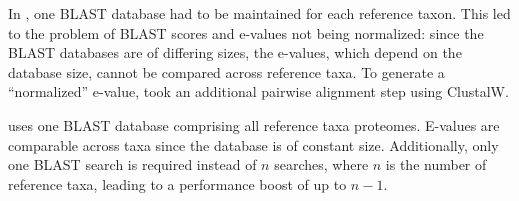 In \hamstr, one BLAST database had to be maintained for each reference taxon.
This led to the problem of BLAST scores and e-values not being normalized: since
the \hamstr BLAST databases are of differing sizes, the e-values, which depend
on the database size, cannot be compared across reference taxa. To generate a
``normalized'' e-value, \hamstr took an additional pairwise alignment step using
ClustalW.

\pname uses one BLAST database comprising all reference taxa proteomes. E-values
are comparable across taxa since the database is of constant size. Additionally,
only one BLAST search is required instead of $n$ searches, where $n$ is the
number of reference taxa, leading to a performance boost of up to $n-1$.

